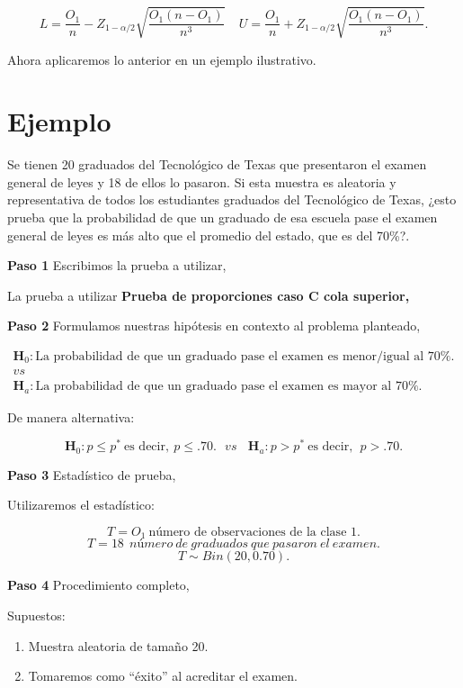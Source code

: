 \documentclass[
  a4paper,
  oneside,
  openany]{book}
\begin{document}
\[L=\frac{O_{1}}{n}-Z_{1-\alpha/2}\sqrt{\frac{O_{1}(n-O_{1})}{n^3}} \ \ \ \ \  U=\frac{O_{1}}{n}+Z_{1-\alpha/2}\sqrt{\frac{O_{1}(n-O_{1})}{n^3}}.\]

Ahora aplicaremos lo anterior en un ejemplo ilustrativo.

\hypertarget{ejemplo}{%
\section{Ejemplo}\label{ejemplo}}

Se tienen 20 graduados del Tecnológico de Texas que presentaron el examen general de leyes y 18 de ellos lo pasaron. Si esta muestra es aleatoria y representativa de todos los estudiantes graduados del Tecnológico de Texas,
¿esto prueba que la probabilidad de que un graduado de esa escuela pase el examen general de leyes es más alto que el promedio del estado, que es del 70\%?.

\textbf{Paso 1} Escribimos la prueba a utilizar,

La prueba a utilizar \textbf{Prueba de proporciones caso C cola superior,}

\textbf{Paso 2} Formulamos nuestras hipótesis en contexto al problema planteado,

\[
\begin{array}{c}
\textbf{H}_{0}: \mbox{La probabilidad de que un graduado pase el examen es menor/igual al } 70\%.\\
vs\\
\textbf{H}_{a}: \mbox{La probabilidad de que un graduado pase el examen es mayor al }70\%.
\end{array}
\]

De manera alternativa:

\[\textbf{H}_{0}: p  \leq p^* \ \mbox{es decir},  \ p  \leq .70.\ \ \  vs \ \ \ \ \textbf{H}_{a}: p >p^* \ \mbox{es decir}, \ \ p > .70.\]

\textbf{Paso 3} Estadístico de prueba,

Utilizaremos el estadístico:

\[T=O_{1} \ \mbox{número  de  observaciones  de  la clase 1.}\]
\[T=18 \ \ número\ de\ graduados\ que\ pasaron\ el\ examen.\]
\[T\sim Bin(20,0.70).\]

\textbf{Paso 4} Procedimiento completo,

Supuestos:

\begin{enumerate}
\def\labelenumi{\arabic{enumi}.}
\item
  Muestra aleatoria de tamaño 20.
\item
  Tomaremos como ``éxito'' al acreditar el examen.
\end{enumerate}
\end{document}
